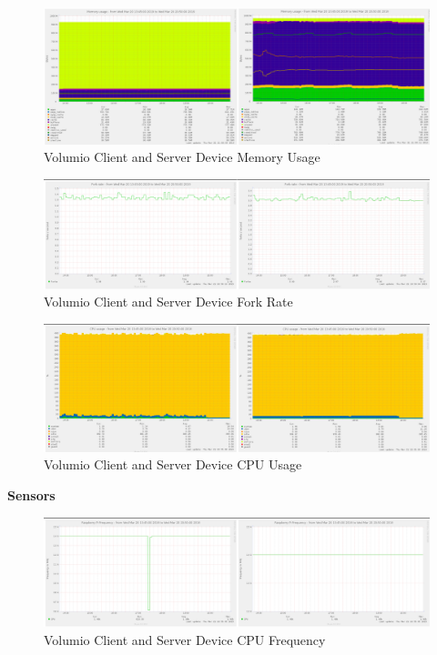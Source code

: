 \documentclass[11pt,a4paper,headinclude=false,footinclude=false]{scrreprt}
\begin{document}
\begin{figure}[H]
\includegraphics{ResultsAndAnalysis/VolumioServerTestImages/017VolumioMemoryUsage.png}
\centering
\caption{Volumio Client and Server Device Memory Usage}
\label{VolumioMemUse}
\end{figure}

\begin{figure}[H]
\includegraphics{ResultsAndAnalysis/VolumioServerTestImages/013VolumioForkRate.png}
\centering
\caption{Volumio Client and Server Device Fork Rate}
\label{VolumioForkRate}
\end{figure}

\begin{figure}[H]
\includegraphics{ResultsAndAnalysis/VolumioServerTestImages/004VolumioCPUUsage.png}
\centering
\caption{Volumio Client and Server Device CPU Usage}
\label{VolumioCPUUsage}
\end{figure}

\textbf{Sensors}

\begin{figure}[H]
\includegraphics{ResultsAndAnalysis/VolumioServerTestImages/001VolumioCPUFreq.png}
\centering
\caption{Volumio Client and Server Device CPU Frequency}
\label{VolumioCPUFreq}
\end{figure}
\end{document}
